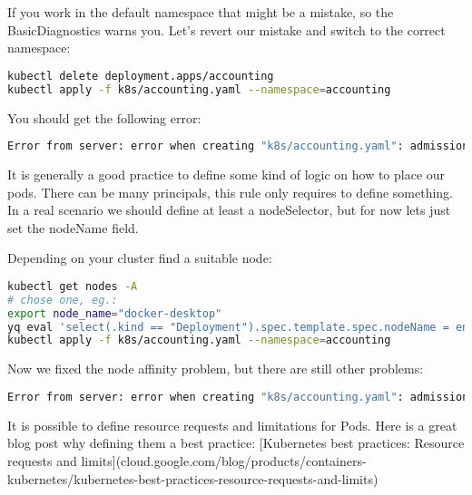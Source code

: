 If you work in the default namespace that might be a mistake, so the BasicDiagnostics warns you. Let's revert our mistake and switch to the correct namespace:

\begin{lstlisting}[caption={TODO},language=bash,label=code:bashx]
kubectl delete deployment.apps/accounting
kubectl apply -f k8s/accounting.yaml --namespace=accounting
\end{lstlisting}

You should get the following error:

\begin{lstlisting}[caption={TODO},language=bash,label=code:todo]
Error from server: error when creating "k8s/accounting.yaml": admission webhook "node-affinity.btieger.me" denied the request: Deployment must have some kind of node affinity! (affinity, nodeSelector, nodeName)
\end{lstlisting}

It is generally a good practice to define some kind of logic on how to place our pods. There can be many principals, this rule only requires to define something. In a real scenario we should define at least a nodeSelector, but for now lets just set the nodeName field.

Depending on your cluster find a suitable node:

\begin{lstlisting}[caption={Fix node affinity error},language=bash,label=code:bashx]
kubectl get nodes -A
# chose one, eg.:
export node_name="docker-desktop"
yq eval 'select(.kind == "Deployment").spec.template.spec.nodeName = env(node_name)' k8s/accounting.yaml -i
kubectl apply -f k8s/accounting.yaml --namespace=accounting
\end{lstlisting}

Now we fixed the node affinity problem, but there are still other problems:

\begin{lstlisting}[caption={TODO},language=bash,label=code:todo]
Error from server: error when creating "k8s/accounting.yaml": admission webhook "deny-no-resources.btieger.me" denied the request: Deployment must have resource definitions!
\end{lstlisting}

It is possible to define resource requests and limitations for Pods. Here is a great blog post why defining them a best practice: [Kubernetes best practices: Resource requests and limits](cloud.google.com/blog/products/containers-kubernetes/kubernetes-best-practices-resource-requests-and-limits)

